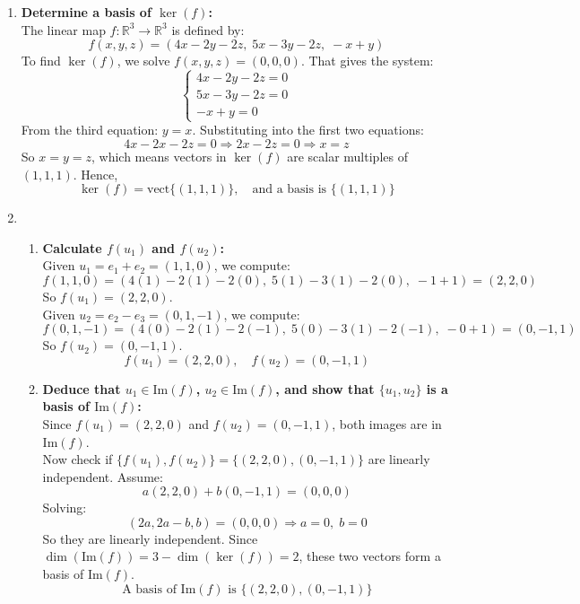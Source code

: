\documentclass[12pt]{article}
\begin{document}
\begin{answerbox}
\begin{enumerate}
    \item \textbf{Determine a basis of $\ker(f)$:} \\
    The linear map $f: \mathbb{R}^3 \to \mathbb{R}^3$ is defined by:
    $$
    f(x, y, z) = (4x - 2y - 2z,\; 5x - 3y - 2z,\; -x + y)
    $$
    To find $\ker(f)$, we solve $f(x, y, z) = (0, 0, 0)$. That gives the system:
    $$
    \begin{cases}
        4x - 2y - 2z = 0 \\
        5x - 3y - 2z = 0 \\
        -x + y = 0
    \end{cases}
    $$
    From the third equation: $y = x$. Substituting into the first two equations:
    $$
    4x - 2x - 2z = 0 \Rightarrow 2x - 2z = 0 \Rightarrow x = z
    $$
    So $x = y = z$, which means vectors in $\ker(f)$ are scalar multiples of $(1, 1, 1)$. Hence,
    $$
    \boxed{\ker(f) = \text{vect}\{(1, 1, 1)\}, \quad \text{and a basis is } \{(1, 1, 1)\}}
    $$

    \item 
    \begin{enumerate}
        \item \textbf{Calculate $f(u_1)$ and $f(u_2)$:} \\
    Given $u_1 = e_1 + e_2 = (1, 1, 0)$, we compute:
    $$
    f(1, 1, 0) = (4(1) - 2(1) - 2(0),\; 5(1) - 3(1) - 2(0),\; -1 + 1) = (2, 2, 0)
    $$
    So $f(u_1) = (2, 2, 0)$. \\
    Given $u_2 = e_2 - e_3 = (0, 1, -1)$, we compute:
    $$
    f(0, 1, -1) = (4(0) - 2(1) - 2(-1),\; 5(0) - 3(1) - 2(-1),\; -0 + 1) = (0, -1, 1)
    $$
    So $f(u_2) = (0, -1, 1)$.
    $$
    \boxed{f(u_1) = (2, 2, 0), \quad f(u_2) = (0, -1, 1)}
    $$

    \item \textbf{Deduce that $u_1 \in \text{Im}(f)$, $u_2 \in \text{Im}(f)$, and show that $\{u_1, u_2\}$ is a basis of $\text{Im}(f)$:} \\
    Since $f(u_1) = (2, 2, 0)$ and $f(u_2) = (0, -1, 1)$, both images are in $\text{Im}(f)$. \\
    Now check if $\{f(u_1), f(u_2)\} = \{(2, 2, 0), (0, -1, 1)\}$ are linearly independent. Assume:
    $$
    a(2, 2, 0) + b(0, -1, 1) = (0, 0, 0)
    $$
    Solving:
    $$
    (2a, 2a - b, b) = (0, 0, 0) \Rightarrow a = 0,\; b = 0
    $$
    So they are linearly independent. Since $\dim(\text{Im}(f)) = 3 - \dim(\ker(f)) = 2$, these two vectors form a basis of $\text{Im}(f)$.
    $$
    \boxed{\text{A basis of } \text{Im}(f) \text{ is } \{(2, 2, 0), (0, -1, 1)\}}
    $$


\end{enumerate}
\end{enumerate}
\end{answerbox}
\end{document}
